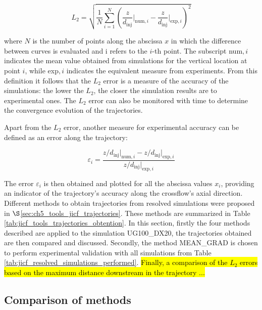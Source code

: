 \begin{equation}
\label{eq:L2_JICF}
    L_2 = \sqrt{\frac{1}{N}   \sum_{i=1}^N \left( \frac{z}{d_\mathrm{inj}} \Bigr|_{\mathrm{num},i} -   \frac{z}{d_\mathrm{inj}} \Bigr|_{\mathrm{exp},i} \right)^2}
\end{equation}

where $N$ is the number of points along the abscissa $x$ in which the difference between curves is evaluated and i refers to the $i$-th point. The subscript num$,i$ indicates the mean value obtained from simulations for the vertical location at point $i$, while exp$,i$ indicates the equivalent measure from experiments. From this definition it follows that the $L_2$ error is a measure of the accuracy of the simulations: the lower the $L_2$, the closer the simulation results are to experimental ones. The $L_2$ error can also be monitored with time to determine the convergence evolution of the trajectories.

Apart from the $L_2$ error, another measure for experimental accuracy can be defined as an error along the trajectory:



\begin{equation}
\varepsilon_i  =  \frac{ z/d_\mathrm{inj} \Bigr|_{\mathrm{num},i} - z/d_\mathrm{inj} \Bigr|_{\mathrm{exp},i} }{ z/d_\mathrm{inj} \Bigr|_{\mathrm{exp},i} }
\end{equation}

The error $\varepsilon_i$ is then obtained and plotted for all the abscissa values $x_i$, providing an indicator of the trajectory’s accuracy along the crossflow’s axial direction. \\

Different methods to obtain trajectories from resolved simulations were proposed in $\S$\ref{sec:ch5_tools_jicf_trajectories}. These methods are summarized in Table \ref{tab:jicf_tools_trajectories_obtention}. In this section, firstly  the four methods described are applied to the simulation UG100\_DX20, the trajectories obtained are then compared and discussed. Secondly, the method MEAN\_GRAD is chosen to perform experimental validation with all simulations from Table \ref{tab:jicf_resolved_simulations_performed}. \hl{Finally, a comparison
of the $L_2$ errors based on the maximum distance downstream in the trajectory ...}

\clearpage


\subsection{Comparison of methods}



